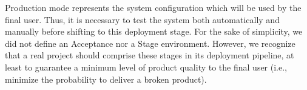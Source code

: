Production mode represents the system configuration which will be used by the final user. Thus, it is necessary
to test the system both automatically and manually before shifting to this deployment stage. For the sake of
simplicity, we did not define an Acceptance nor a Stage environment. However, we recognize that a real project should comprise these
stages in its deployment pipeline, at least to guarantee a minimum level of product quality to the final user (i.e., minimize the probability to deliver a broken product).

